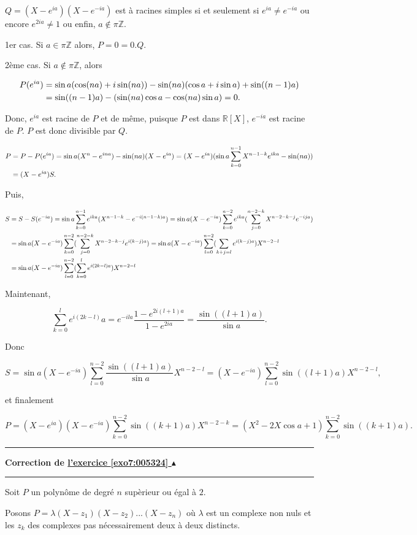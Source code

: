 \documentclass[11pt,a4paper]{article}
\newcommand{\Zz}{\mathbb{Z}} \newcommand{\Z}{\mathbb{Z}}
\newcommand{\Rr}{\mathbb{R}} \newcommand{\R}{\mathbb{R}}
\newcounter{exo}
\newcommand{\correction}[1]{\hypertarget{cor7:#1}{}\label{cor7:#1}{\bf Correction de \hyperlink{exo7:#1}{l'exercice \ref{exo7:#1} $\blacktriangle$}}\vspace{1mm}\hrule\vspace{1mm}}
\newcommand{\fincorrection}{\vspace{1mm}\hrule\vspace*{7mm}}
\begin{document}
$Q=(X-e^{ia})(X-e^{-ia})$ est à racines simples si et seulement si $e^{ia}\neq e^{-ia}$ ou encore $e^{2ia}\neq 1$ ou enfin, $a\notin\pi\Zz$.

1er cas. Si $a\in\pi\Zz$ alors, $P=0=0.Q$.

2ème cas. Si $a\notin\pi\Zz$, alors 

\begin{align*}\ensuremath
P(e^{ia})&=\sin a(\cos(na)+i\sin(na))-\sin(na)(\cos a+i\sin a)+\sin((n-1)a)\\
 &=\sin((n-1)a)-(\sin(na)\cos a-\cos(na)\sin a)=0.
\end{align*}

Donc, $e^{ia}$ est racine de $P$ et de même, puisque $P$ est dans $\Rr[X]$, $e^{-ia}$ est racine de $P$. $P$ est donc divisible par $Q$.

\begin{align*}\ensuremath
P&=P-P(e^{ia})=\sin a(X^n-e^{ina})-\sin(na)(X-e^{ia})=(X-e^{ia})(\sin a\sum_{k=0}^{n-1}X^{n-1-k}e^{ika}-\sin(na))\\
 &=(X-e^{ia})S.
\end{align*}
 
Puis,

\begin{align*}\ensuremath
S&=S-S(e^{-ia})=\sin a\sum_{k=0}^{n-1}e^{ika}(X^{n-1-k}-e^{-i(n-1-k)a})=\sin a(X-e^{-ia})\sum_{k=0}^{n-2}e^{ika}(\sum_{j=0}^{n-2-k}X^{n-2-k-j}e^{-ija})\\
 &=\sin a(X-e^{-ia})\sum_{k=0}^{n-2}(\sum_{j=0}^{n-2-k}X^{n-2-k-j}e^{i(k-j)a})
=\sin a(X-e^{-ia})\sum_{l=0}^{n-2}(\sum_{k+j=l}^{}e^{i(k-j)a})X^{n-2-l}\\
 &=\sin a(X-e^{-ia})\sum_{l=0}^{n-2}(\sum_{k=0}^{l}e^{i(2k-l)a})X^{n-2-l}
\end{align*}
 
Maintenant,

$$\sum_{k=0}^{l}e^{i(2k-l)}a=e^{-ila}\frac{1-e^{2i(l+1)a}}{1-e^{2ia}}=\frac{\sin((l+1)a)}{\sin a}.$$

Donc

$$S=\sin a(X-e^{-ia})\sum_{l=0}^{n-2}\frac{\sin((l+1)a)}{\sin a}X^{n-2-l}=(X-e^{-ia})\sum_{l=0}^{n-2}\sin((l+1)a)X^{n-2-l},$$

et finalement 

$$P=(X-e^{ia})(X-e^{-ia})\sum_{k=0}^{n-2}\sin((k+1)a)X^{n-2-k}=(X^2-2X\cos a+1)\sum_{k=0}^{n-2}\sin((k+1)a).$$
\fincorrection
\correction{005324}
Soit $P$ un polynôme de degré $n$ supèrieur ou égal à $2$.

Posons $P=\lambda(X-z_1)(X-z_2)...(X-z_n)$ où $\lambda$ est un complexe non nuls et les $z_k$ des complexes pas nécessairement deux à deux distincts.
\end{document}
